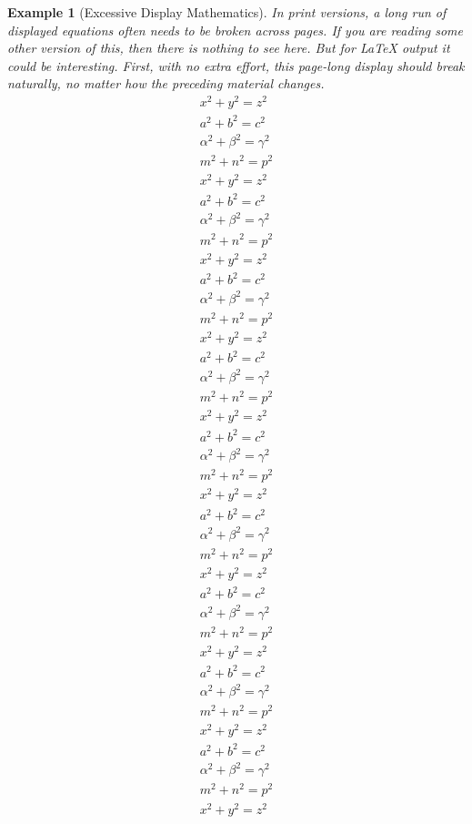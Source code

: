 \documentclass{sn-jnl}
\theoremstyle{thmstyleone}%
\theoremstyle{thmstyletwo}%
\newtheorem{example}[theorem]{Example}
\theoremstyle{thmstylethree}%
\numberwithin{equation}{section}
\begin{document}
\begin{example}[Excessive Display Mathematics]\label{section-mathematics-4-9}%
%
In print versions, a long run of displayed equations often needs to be broken across pages.  If you are reading some other version of this, then there is nothing to see here.  But for \LaTeX{} output it could be interesting.  First, with no extra effort, this page-long display should break naturally, no matter how the preceding material changes.%
\begin{gather*}
x^2+y^2=z^2\\
a^2+b^2=c^2\\
\alpha^2+\beta^2=\gamma^2\\
m^2+n^2=p^2\\
x^2+y^2=z^2\\
a^2+b^2=c^2\\
\alpha^2+\beta^2=\gamma^2\\
m^2+n^2=p^2\\
x^2+y^2=z^2\\
a^2+b^2=c^2\\
\alpha^2+\beta^2=\gamma^2\\
m^2+n^2=p^2\\
x^2+y^2=z^2\\
a^2+b^2=c^2\\
\alpha^2+\beta^2=\gamma^2\\
m^2+n^2=p^2\\
x^2+y^2=z^2\\
a^2+b^2=c^2\\
\alpha^2+\beta^2=\gamma^2\\
m^2+n^2=p^2\\
x^2+y^2=z^2\\
a^2+b^2=c^2\\
\alpha^2+\beta^2=\gamma^2\\
m^2+n^2=p^2\\
x^2+y^2=z^2\\
a^2+b^2=c^2\\
\alpha^2+\beta^2=\gamma^2\\
m^2+n^2=p^2\\
x^2+y^2=z^2\\
a^2+b^2=c^2\\
\alpha^2+\beta^2=\gamma^2\\
m^2+n^2=p^2\\
x^2+y^2=z^2\\
a^2+b^2=c^2\\
\alpha^2+\beta^2=\gamma^2\\
m^2+n^2=p^2\\
x^2+y^2=z^2\\

\end{gather*}
\end{example}
\end{document}
